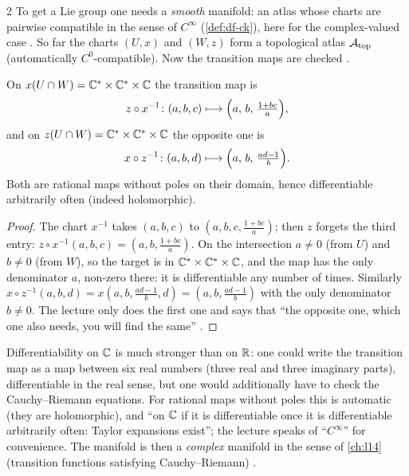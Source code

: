 \begin{paracol}{2}
To get a Lie group one needs a \emph{smooth} manifold: an atlas whose charts are pairwise compatible in the sense of $C^\infty$ (\cref{def:df-ck}), here for the complex-valued case    . So far the charts $(U,x)$ and $(W,z)$ form a topological atlas $\mathcal A_{\rm top}$ (automatically $C^0$-compatible). Now the transition maps are checked   .
\begin{proposition}\label{prop:sl-transition}
On $x(U\cap W)=\mathbb{C}^*\times\mathbb{C}^*\times\mathbb{C}$ the transition map is
\[
  z\circ x^{-1}\colon(a,b,c)\longmapsto\Bigl(a,\,b,\,\tfrac{1+bc}{a}\Bigr),
\]
and on $z(U\cap W)=\mathbb{C}^*\times\mathbb{C}^*\times\mathbb{C}$ the opposite one is
\[
  x\circ z^{-1}\colon(a,b,d)\longmapsto\Bigl(a,\,b,\,\tfrac{ad-1}{b}\Bigr).
\]
Both are rational maps without poles on their domain, hence differentiable arbitrarily often (indeed holomorphic).
\end{proposition}
\begin{proof}
The chart $x^{-1}$ takes $(a,b,c)$ to $(a,b,c,\frac{1+bc}{a})$; then $z$ forgets the third entry: $z\circ x^{-1}(a,b,c)=(a,b,\frac{1+bc}{a})$. On the intersection $a\ne0$ (from $U$) and $b\ne0$ (from $W$), so the target is in $\mathbb{C}^*\times\mathbb{C}^*\times\mathbb{C}$, and the map has the only denominator $a$, non-zero there: it is differentiable any number of times. Similarly $x\circ z^{-1}(a,b,d)=x(a,b,\frac{ad-1}{b},d)=(a,b,\frac{ad-1}{b})$ with the only denominator $b\ne0$. The lecture only does the first one and says that ``the opposite one, which one also needs, you will find the same''               .
\end{proof}
\begin{coursenote}
Differentiability on $\mathbb{C}$ is much stronger than on $\mathbb{R}$: one could write the transition map as a map between six real numbers (three real and three imaginary parts), differentiable in the real sense, but one would additionally have to check the Cauchy--Riemann equations. For rational maps without poles this is automatic (they are holomorphic), and ``on $\mathbb{C}$ if it is differentiable once it is differentiable arbitrarily often: Taylor expansions exist''; the lecture speaks of ``$C^\infty$'' for convenience. The manifold is then a \emph{complex} manifold in the sense of \cref{ch:l14} (transition functions satisfying Cauchy--Riemann)   .

\end{coursenote}
\end{paracol}
